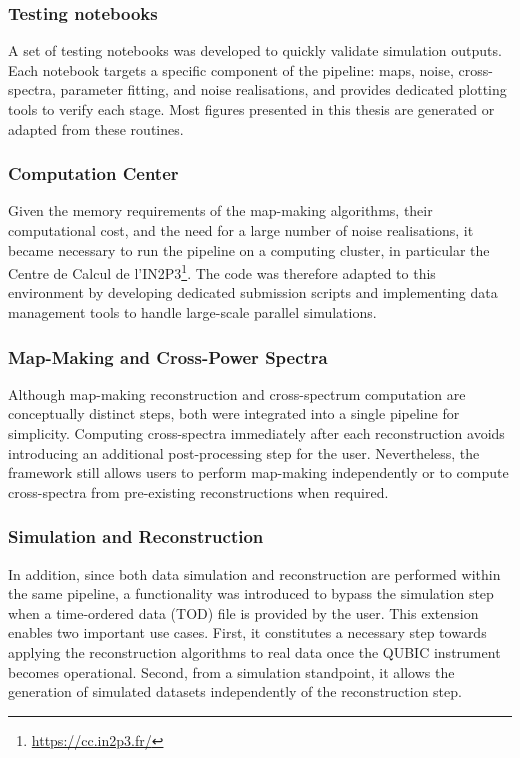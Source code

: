 \documentclass[../../thesis.tex]{subfiles}
\begin{document}
\subsubsection{Testing notebooks}

A set of testing notebooks was developed to quickly validate simulation outputs. Each notebook targets a specific component of the pipeline: maps, noise, cross-spectra, parameter fitting, and noise realisations, and provides dedicated plotting tools to verify each stage. Most figures presented in this thesis are generated or adapted from these routines.

\subsubsection{Computation Center}

Given the memory requirements of the map-making algorithms, their computational cost, and the need for a large number of noise realisations, it became necessary to run the pipeline on a computing cluster, in particular the Centre de Calcul de l'IN2P3\footnote{\url{https://cc.in2p3.fr/}}. The code was therefore adapted to this environment by developing dedicated submission scripts and implementing data management tools to handle large-scale parallel simulations.

\subsubsection{Map-Making and Cross-Power Spectra}

Although map-making reconstruction and cross-spectrum computation are conceptually distinct steps, both were integrated into a single pipeline for simplicity. Computing cross-spectra immediately after each reconstruction avoids introducing an additional post-processing step for the user. Nevertheless, the framework still allows users to perform map-making independently or to compute cross-spectra from pre-existing reconstructions when required.

\subsubsection{Simulation and Reconstruction}

In addition, since both data simulation and reconstruction are performed within the same pipeline, a functionality was introduced to bypass the simulation step when a time-ordered data (TOD) file is provided by the user. This extension enables two important use cases. First, it constitutes a necessary step towards applying the reconstruction algorithms to real data once the QUBIC instrument becomes operational. Second, from a simulation standpoint, it allows the generation of simulated datasets independently of the reconstruction step.
\end{document}
